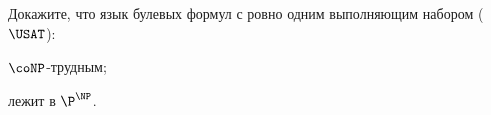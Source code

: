 Докажите, что язык булевых формул с ровно одним выполняющим набором ($\USAT$):
\begin{enumcyr}
    \item $\coNP$-трудным;
    \item лежит в $\P^{\NP}$.
\end{enumcyr}
